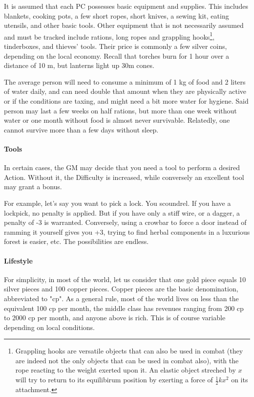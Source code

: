 It is assumed that each PC possesses basic equipment and supplies. This includes blankets, cooking pots, a few short ropes, short knives, a sewing kit, eating utensils, and other basic tools. Other equipment that is not necessarily assumed and must be tracked include rations, long ropes and grappling hooks\footnote{Grappling hooks are versatile objects that can also be used in combat (they are indeed not the only objects that can be used in combat also), with the rope reacting to the weight exerted upon it. An elastic object streched by $x$ will try to return to its equilibirum position by exerting a force of $\frac{1}{2}kx^2$ on its attachment.}, tinderboxes, and thieves' tools. Their price is commonly a few silver coins, depending on the local economy. Recall that torches burn for 1 hour over a distance of 10 m, but lanterns light up 30m cones.

The average person will need to consume a minimum of 1 kg of food and 2 liters of water daily, and can need double that amount when they are physically active or if the conditions are taxing, and might need a bit more water for hygiene. Said person may last a few weeks on half rations, but more than one week without water or one month without food is almost never survivable. Relatedly, one cannot survive more than a few days without sleep.


\paragraph{Tools}

In certain cases, the GM may decide that you need a tool to perform a desired Action. Without it, the Difficulty is increased, while conversely an excellent tool may grant a bonus.

For example, let's say you want to pick a lock. You scoundrel. If you have a lockpick, no penalty is applied. But if you have only a stiff wire, or a dagger, a penalty of -3 is warranted. Conversely, using a crowbar to force a door instead of ramming it yourself gives you +3, trying to find herbal components in a luxurious forest is easier, etc. The possibilities are endless.


\paragraph{Lifestyle}

For simplicity, in most of the world, let us consider that one gold piece equals 10 silver pieces and 100 copper pieces. Copper pieces are the basic denomination, abbreviated to "cp". As a general rule, most of the world lives on less than the equivalent 100 cp per month, the middle class has revenues ranging from 200 cp to 2000 cp per month, and anyone above is rich. This is of course variable depending on local conditions.

